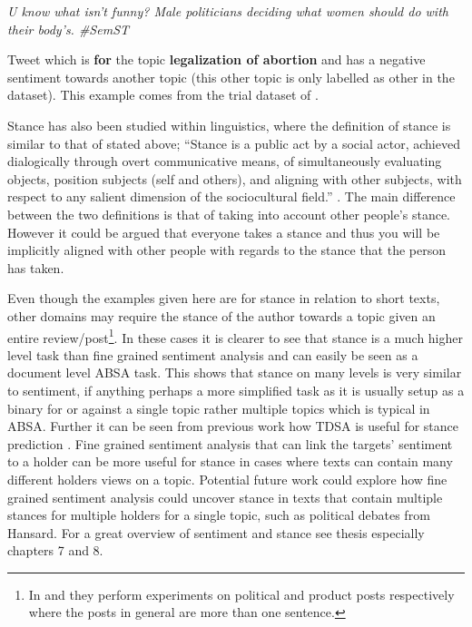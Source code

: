 \begin{example}
\textit{U know what isn't funny? Male politicians deciding what women should do with their body's. \#SemST}
\caption{Tweet which is \textbf{for} the topic \textbf{legalization of abortion} and has a negative sentiment towards another topic (this other topic is only labelled as other in the dataset). This example comes from the trial dataset of \citet{mohammad2017stance}.}
\label{example:lit_review_stance_other_negative}
\end{example}

Stance has also been studied within linguistics, where the definition of stance is similar to that of \citet{somasundaran-wiebe-2010-recognizing} stated above; ``Stance is a public act by a social actor, achieved dialogically through overt communicative means, of simultaneously evaluating objects, position subjects (self and others), and aligning with other subjects, with respect to any salient dimension of the sociocultural field.'' \citep{du2007stance}. The main difference between the two definitions is that of \citet{du2007stance} taking into account other people's stance. However it could be argued that everyone takes a stance and thus you will be implicitly aligned with other people with regards to the stance that the person has taken.

Even though the examples given here are for stance in relation to short texts, other domains may require the stance of the author towards a topic given an entire review/post\footnote{In \citet{somasundaran-wiebe-2010-recognizing} and \citet{somasundaran-wiebe-2009-recognizing} they perform experiments on political and product posts respectively where the posts in general are more than one sentence.}. In these cases it is clearer to see that stance is a much higher level task than fine grained sentiment analysis and can easily be seen as a document level ABSA task. This shows that stance on many levels is very similar to sentiment, if anything perhaps a more simplified task as it is usually setup as a binary for or against a single topic rather multiple topics which is typical in ABSA. Further it can be seen from previous work how TDSA is useful for stance prediction \citep{somasundaran-wiebe-2009-recognizing, somasundaran-wiebe-2010-recognizing}. Fine grained sentiment analysis that can link the targets' sentiment to a holder can be more useful for stance in cases where texts can contain many different holders views on a topic. Potential future work could explore how fine grained sentiment analysis could uncover stance in texts that contain multiple stances for multiple holders for a single topic, such as political debates from Hansard. For a great overview of sentiment and stance see \citet{somasundaran2010discourse} thesis especially chapters 7 and 8.

